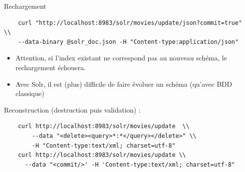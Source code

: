 \begin{frame}[fragile]{Rechargement}

\begin{verbatim}
    curl "http://localhost:8983/solr/movies/update/json?commit=true" \\
    --data-binary @solr_doc.json -H "Content-type:application/json"
\end{verbatim}

\begin{itemize}
  \item Attention, si l'index existant ne correspond pas au nouveau schéma, le rechargement échouera. 
  \item Avec Solr, il est (plus) difficile de faire évoluer un schéma (qu'avec BDD classique)
\end{itemize}
\smallskip
Reconstruction (destruction puis validation) :
\begin{verbatim}
    curl http://localhost:8983/solr/movies/update  \\
        --data "<delete><query>*:*</query></delete>" \\
        -H "Content-type:text/xml; charset=utf-8"
    curl http://localhost:8983/solr/movies/update \\
      --data "<commit/>' -H 'Content-type:text/xml; charset=utf-8"
\end{verbatim}
\end{frame}

